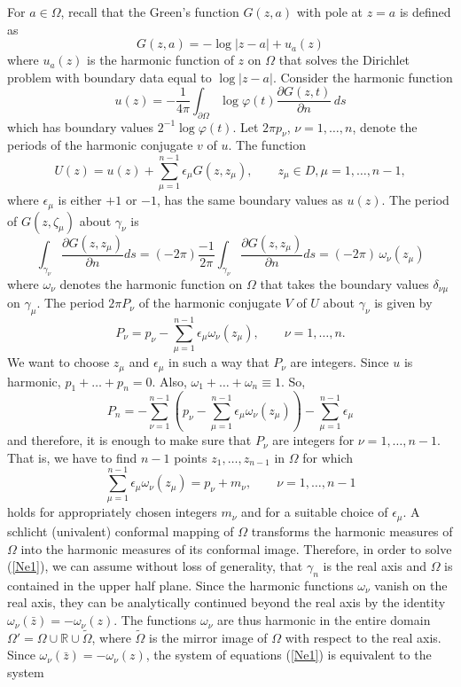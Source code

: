 \documentclass[11pt, reqno]{amsart}
\numberwithin{equation}{section}
\newcommand{\z}{\zeta}
\newcommand{\Om}{\Omega}
\begin{document}
For $a \in \Om$, recall that the Green's function $G(z, a)$ with pole at $z=a$ is defined as
\[
G(z,a) = -\log\vert z-a\vert + u_a(z)
\]
where $u_a(z)$ is the harmonic function of $z$ on $\Om$ that solves the Dirichlet problem with boundary data equal to $\log \vert z-a\vert$. Consider the harmonic function
\[
u(z) = -\frac{1}{4\pi} \int_{\partial\Om} \log \varphi(t) \frac{\partial G(z,t)}{\partial n}\, ds
\]
which has boundary values $2^{-1}\log \varphi(t)$. Let $2\pi p_{\nu}$, $\nu = 1,\ldots,n$, denote the periods of the harmonic conjugate $v$ of $u$. The function
\begin{equation}\label{Uform}
U(z) = u(z) + \sum_{\mu=1}^{n-1}\epsilon_{\mu} G(z,z_{\mu}),
\quad \quad z_{\mu}\in D, \mu =1,\ldots,n-1,
\end{equation}
where $\epsilon_{\mu}$ is either $+1$ or $-1$, has the same boundary values as $u(z)$. The period of $G(z,\z_{\mu})$ about $\gamma_{\nu}$ is
\[
\int_{\gamma_{\nu}} \frac{\partial G(z,z_{\mu})}{\partial n} ds 
=
(-2\pi) \frac{-1}{2\pi} \int_{\gamma_{\nu}} \frac{\partial G(z,z_{\mu})}{\partial n} ds
=
(-2\pi) \,\omega_{\nu}(z_{\mu})
\]
where $\omega_{\nu}$ denotes the harmonic function on $\Omega$ that takes the boundary values $\delta_{\nu\mu}$ on $\gamma_{\mu}$. The period $2\pi P_{\nu}$ of the harmonic conjugate $V$ of $U$ about $\gamma_{\nu}$ is given by
\[
P_{\nu} = p_{\nu} - \sum_{\mu=1}^{n-1} \epsilon_{\mu} \omega_{\nu}(z_{\mu}), 
\quad \quad \nu =1,\ldots,n.
\]
We want to choose $z_{\mu}$ and $\epsilon_{\mu}$ in such a way that $P_{\nu}$ are integers. Since $u$ is harmonic, $p_1+\ldots+p_n = 0$. Also, $\omega_1+\ldots+\omega_n \equiv 1$. So, 
\[
P_n = -\sum_{\nu=1}^{n-1} \left(p_{\nu} 
-
\sum_{\mu=1}^{n-1}\epsilon_{\mu}\omega_{\nu}(z_{\mu})\right) -\sum_{\mu=1}^{n-1}\epsilon_{\mu}
\]
and therefore, it is enough to make sure that $P_{\nu}$ are integers for $\nu=1,\ldots,n-1$. That is, we have to find $n-1$ points $z_1,\ldots,z_{n-1}$ in $\Om$ for which 
\begin{equation}\label{Ne1}
	\sum_{\mu=1}^{n-1}\epsilon_{\mu}\omega_{\nu}(z_{\mu}) = p_{\nu} + m_{\nu},
	\quad\quad \nu =1,\ldots, n-1
\end{equation}
holds for appropriately chosen integers $m_{\nu}$ and for a suitable choice of $\epsilon_{\mu}$. A schlicht (univalent) conformal mapping of $\Om$ transforms the harmonic measures of $\Om$ into the harmonic measures of its conformal image. Therefore, in order to solve (\ref{Ne1}), we can assume without loss of generality, that $\gamma_n$ is the real axis and $\Om$ is contained in the upper half plane. Since the harmonic functions $\omega_{\nu}$ vanish on the real axis, they can be analytically continued beyond the real axis by the identity $\omega_{\nu}(\bar{z}) = - \omega_{\nu}(z)$. The functions $\omega_{\nu}$ are thus harmonic in the entire domain $\Omega' = \Omega \cup \mathbb{R} \cup \tilde{\Om}$, where $\tilde{\Om}$ is the mirror image of $\Om$ with respect to the real axis. Since $\omega_{\nu}(\bar{z}) = - \omega_{\nu}(z)$, the system of equations (\ref{Ne1}) is equivalent to the system
\end{document}
